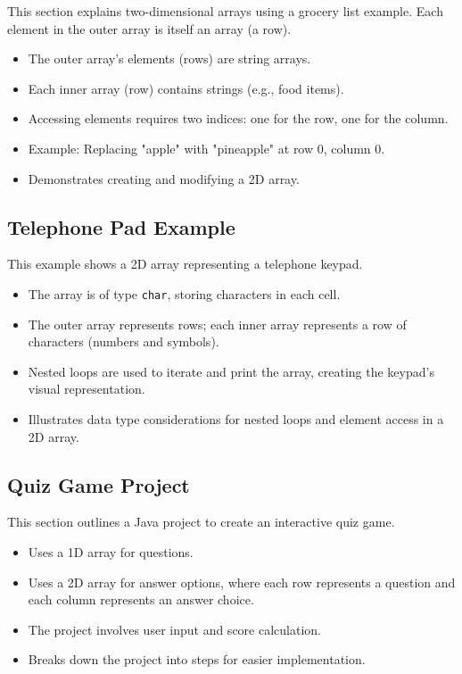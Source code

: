 \documentclass{article}
\begin{document}
This section explains two-dimensional arrays using a grocery list example.  Each element in the outer array is itself an array (a row).

\begin{itemize}
    \item The outer array's elements (rows) are string arrays.
    \item Each inner array (row) contains strings (e.g., food items).
    \item Accessing elements requires two indices: one for the row, one for the column.
    \item  Example: Replacing "apple" with "pineapple" at row 0, column 0.
    \item  Demonstrates creating and modifying a 2D array.
\end{itemize}

\subsection{Telephone Pad Example}

This example shows a 2D array representing a telephone keypad.

\begin{itemize}
    \item The array is of type \texttt{char}, storing characters in each cell.
    \item The outer array represents rows; each inner array represents a row of characters (numbers and symbols).
    \item Nested loops are used to iterate and print the array, creating the keypad's visual representation.
    \item Illustrates data type considerations for nested loops and element access in a 2D array.
\end{itemize}


\subsection{Quiz Game Project}

This section outlines a Java project to create an interactive quiz game.

\begin{itemize}
    \item Uses a 1D array for questions.
    \item Uses a 2D array for answer options, where each row represents a question and each column represents an answer choice.
    \item The project involves user input and score calculation.
    \item Breaks down the project into steps for easier implementation.
\end{itemize}
\end{document}
